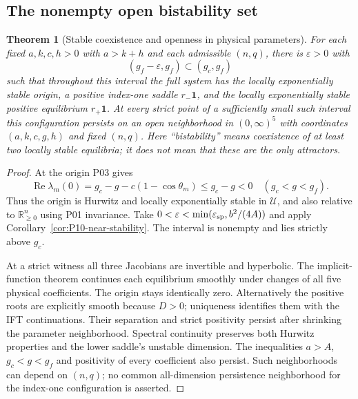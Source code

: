 \documentclass[11pt]{article}
\newcommand{\R}{\mathbb{R}}
\newcommand{\one}{\mathbf{1}}
\newcommand{\Orth}{\R_{\geq 0}^{n}}
\newcommand{\Domain}{\mathcal{U}}
\DeclareMathOperator{\Ree}{Re}
\newtheorem{theorem}{Theorem}[section]
\theoremstyle{definition}
\theoremstyle{remark}
\begin{document}
\subsection{The nonempty open bistability set}
\label{slot:P10-3}

\begin{theorem}[Stable coexistence and openness in physical parameters]
\label{thm:P10-bistability}
For each fixed $a,k,c,h>0$ with $a>k+h$ and each admissible $(n,q)$,
there is $\varepsilon>0$ with
\begin{equation}
 (g_f-\varepsilon,g_f)\subset(g_c,g_f)
 \label{eq:P10-bistable-interval}
\end{equation}
such that throughout this interval the full system has the locally
exponentially stable origin, a positive index-one saddle $r_-\one$,
and the locally exponentially stable positive equilibrium $r_+\one$.
At every strict point of a sufficiently small such interval this
configuration persists on an open neighborhood in $(0,\infty)^5$
with coordinates $(a,k,c,g,h)$ and fixed $(n,q)$.
Here ``bistability'' means coexistence of at least two locally stable
equilibria; it does not mean that these are the only attractors.
\end{theorem}
\begin{proof}
At the origin P03 gives
\[
 \Ree\lambda_m(0)=g_c-g-c(1-\cos\theta_m)\le g_c-g<0
 \quad(g_c<g<g_f).
\]
Thus the origin is Hurwitz and locally exponentially stable in
$\Domain$, and also relative to $\Orth$ using P01 invariance.
Take $0<\varepsilon<\min(\varepsilon_{\rm sp},b^2/(4A))$ and
apply Corollary~\ref{cor:P10-near-stability}. The interval is nonempty
and lies strictly above $g_c$.

At a strict witness all three Jacobians are invertible and hyperbolic.
The implicit-function theorem continues each equilibrium smoothly
under changes of all five physical coefficients. The origin stays
identically zero. Alternatively the positive roots are explicitly
smooth because $D>0$; uniqueness identifies them with the IFT
continuations. Their separation and strict positivity persist after
shrinking the parameter neighborhood. Spectral continuity preserves
both Hurwitz properties and the lower saddle's unstable dimension.
The inequalities $a>A$, $g_c<g<g_f$ and positivity of every coefficient
also persist. Such neighborhoods can depend on $(n,q)$; no common
all-dimension persistence neighborhood for the index-one configuration
is asserted.
\end{proof}
\end{document}
